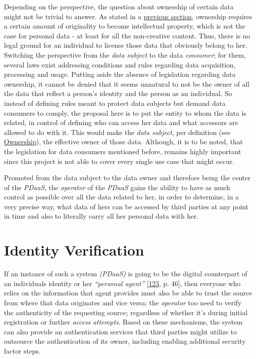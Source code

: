 \documentclass[12pt,english,a4paper,titlepage,cleardoublepage=empty,dottedtoc]{report}
\begin{document}
Depending on the perspective, the question about ownership of certain
data might not be trivial to answer. As stated in a
\protect\hyperlink{digital-identity-personal-data-and-ownership}{previous
section}, ownership requires a certain amount of originality to become
intellectual property, which is not the case for personal data - at
least for all the non-creative content. Thus, there is no legal ground
for an individual to license those data that obviously belong to her.
Switching the perspective from the \emph{data subject} to the data
\emph{consumer}; for them, several laws exist addressing conditions and
rules regarding data acquisition, processing and usage. Putting aside
the absence of legislation regarding data ownership, it cannot be denied
that it seems unnatural to not be the owner of all the data that reflect
a person's identity and the person as an individual. So instead of
defining rules meant to protect data subjects but demand data consumers
to comply, the proposal here is to put the entity to whom the data is
related, in control of defining who can access her data and what
accessors are allowed to do with it. This would make the \emph{data
subject}, per definition (see
\protect\hyperlink{def-ownership}{Ownership}), the effective owner of
those data. Although, it is to be noted, that the legislation for data
consumers mentioned before, remains highly important since this project
is not able to cover every single use case that might occur.

Promoted from the data subject to the data owner and therefore being the
center of the \emph{PDaaS}, the \emph{operator} of the \emph{PDaaS}
gains the ability to have as much control as possible over all the data
related to her, in order to determine, in a very precise way, what data
of hers can be accessed by third parties at any point in time and also
to literally carry all her personal data with her.

\section{Identity Verification}\label{identity-verification}

If an instance of such a system \emph{(PDaaS)} is going to be the
digital counterpart of an individuals identity or her \emph{``personal
agent''}
{[}\protect\hyperlink{ref-book_2015_ethical-it-innovation}{123}, p.
46{]}, then everyone who relies on the information that agent provides
must also be able to trust the source from where that data originates
and vice versa; the \emph{operator} too need to verify the authenticity
of the requesting source; regardless of whether it's during initial
registration or further \emph{access attempts}. Based on these
mechanisms, the system can also provide an authentication services that
third parties might utilize to outsource the authentication of its
owner, including enabling additional security factor steps.
\end{document}
